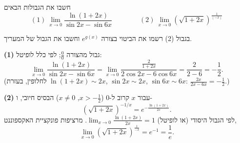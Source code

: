
\begin{question}
חשבו את הגבולות הבאים
\[ (1)\ \lim_{x\to0}\frac{\ln(1+2x)}{\sin2x-\sin6x}\qquad\qquad (2)\ \lim_{x\to0}\left(\sqrt{1+2x}\right)^{\frac{1}{(-x)}} \]
\end{question}

\begin{hint}
בגבול (2) רשמו את הביטוי בצורה $e^{g(x)}$ וחשבו את הגבול של המעריך.
\end{hint}

\begin{solution}
\textbf{(1)} גבול מהצורה $\frac00$; לפי כלל לופיטל:
\[ \lim_{x\to0}\frac{\ln(1+2x)}{\sin2x-\sin6x}=\lim_{x\to0}\frac{\frac{2}{1+2x}}{2\cos2x-6\cos6x}=\frac{2}{2-6}=\boxed{-\frac12}. \]
(לחלופין, בעזרת $\ln(1+2x)\sim2x$, $\sin2x\sim2x$, $\sin6x\sim6x$: $\frac{2x}{2x-6x}=-\frac12$.)

\textbf{(2)} עבור $x$ קרוב ל-$0$ ($x>-\frac12$, $x\neq0$) הבסיס חיובי, ו-
\[ \left(\sqrt{1+2x}\right)^{-1/x}=e^{-\frac{\ln(1+2x)}{2x}}. \]
לפי הגבול היסודי (או לופיטל) $\lim_{x\to0}\frac{\ln(1+2x)}{2x}=1$. מרציפות פונקציית האקספוננט,
\[ \lim_{x\to0}\left(\sqrt{1+2x}\right)^{\frac{1}{-x}}=e^{-1}=\boxed{\frac1e}. \]
\end{solution}
